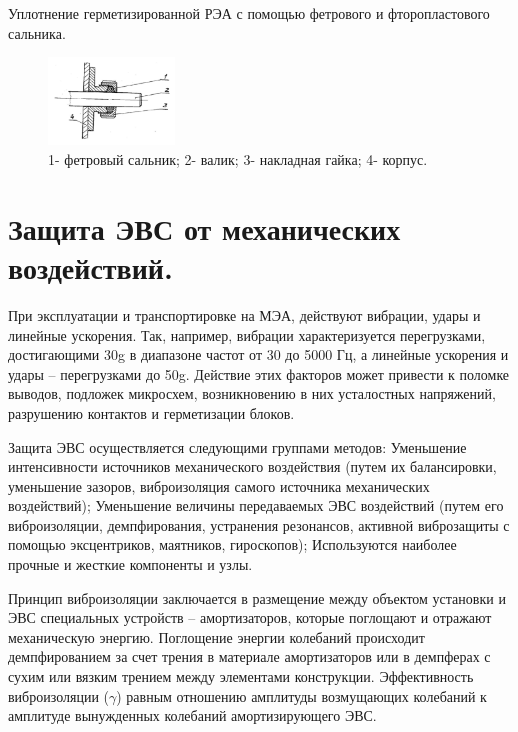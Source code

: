 \documentclass[unicode, 12pt, a4paper, oneside]{article}
\begin{document}
Уплотнение герметизированной РЭА с помощью фетрового  и фторопластового сальника.
\begin{figure}[H]
\centering
\includegraphics[width=0.3\textwidth]{67_fetr.JPG}
\caption{1- фетровый сальник; 2- валик; 3- накладная гайка; 4- корпус.}
\end{figure}


\section{Защита ЭВС от механических воздействий.}

При эксплуатации и транспортировке на МЭА, действуют вибрации, удары и линейные ускорения. Так, например, вибрации характеризуется перегрузками, достигающими 30g в диапазоне частот от 30 до 5000 Гц, а линейные ускорения и удары – перегрузками до 50g. Действие этих факторов может привести к поломке выводов, подложек микросхем, возникновению в них усталостных напряжений, разрушению контактов и герметизации блоков.

Защита ЭВС осуществляется следующими группами методов:  Уменьшение интенсивности источников механического воздействия (путем их балансировки, уменьшение зазоров, виброизоляция самого источника механических воздействий); Уменьшение величины передаваемых ЭВС воздействий (путем его виброизоляции, демпфирования, устранения резонансов, активной виброзащиты с помощью эксцентриков, маятников, гироскопов); Используются наиболее прочные и жесткие компоненты и узлы.

Принцип виброизоляции заключается в размещение между объектом установки и ЭВС специальных устройств – амортизаторов, которые поглощают и отражают механическую энергию. Поглощение энергии колебаний происходит демпфированием за счет трения в материале амортизаторов или в демпферах с сухим или вязким трением между элементами конструкции. Эффективность виброизоляции ($\gamma$) равным отношению амплитуды возмущающих колебаний к амплитуде вынужденных колебаний амортизирующего ЭВС.
\end{document}
